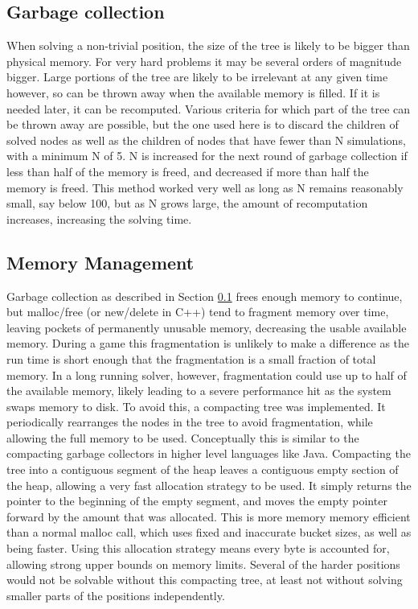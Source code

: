 \subsection{Garbage collection}\label{sec:gc}

When solving a non-trivial position, the size of the tree is likely to be bigger than physical memory. For very hard problems it may be several orders of magnitude bigger. Large portions of the tree are likely to be irrelevant at any given time however, so can be thrown away when the available memory is filled. If it is needed later, it can be recomputed. Various criteria for which part of the tree can be thrown away are possible, but the one used here is to discard the children of solved nodes as well as the children of nodes that have fewer than N simulations, with a minimum N of 5. N is increased for the next round of garbage collection if less than half of the memory is freed, and decreased if more than half the memory is freed. This method worked very well as long as N remains reasonably small, say below 100, but as N grows large, the amount of recomputation increases, increasing the solving time.


\subsection{Memory Management}

Garbage collection as described in Section \ref{sec:gc} frees enough memory to continue, but malloc/free (or new/delete in C++) tend to fragment memory over time, leaving pockets of permanently unusable memory, decreasing the usable available memory. During a game this fragmentation is unlikely to make a difference as the run time is short enough that the fragmentation is a small fraction of total memory. In a long running solver, however, fragmentation could use up to half of the available memory, likely leading to a severe performance hit as the system swaps memory to disk. To avoid this, a compacting tree was implemented. It periodically rearranges the nodes in the tree to avoid fragmentation, while allowing the full memory to be used. Conceptually this is similar to the compacting garbage collectors in higher level languages like Java. Compacting the tree into a contiguous segment of the heap leaves a contiguous empty section of the heap, allowing a very fast allocation strategy to be used. It simply returns the pointer to the beginning of the empty segment, and moves the empty pointer forward by the amount that was allocated. This is more memory memory efficient than a normal malloc call, which uses fixed and inaccurate bucket sizes, as well as being faster. Using this allocation strategy means every byte is accounted for, allowing strong upper bounds on memory limits. Several of the harder positions would not be solvable without this compacting tree, at least not without solving smaller parts of the positions independently.

